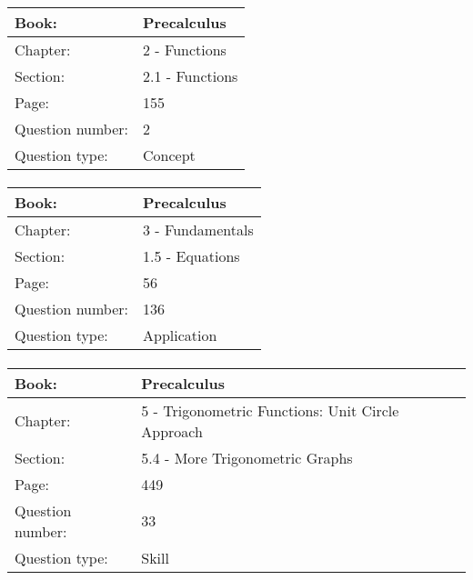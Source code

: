 \documentclass{article}
\begin{document}
   \paragraph{}
   \begin{tabularx}{1\textwidth}{
           p{}
           p{}
       }
       \toprule
       Book: & Precalculus
       \\
       \midrule
       Chapter: & 2 - Functions
       \\
       \midrule
       Section: & 2.1 - Functions
       \\
       \midrule
       Page: & 155
       \\
       \midrule
       Question number: & 2
       \\
       \midrule
       Question type: & Concept
       \\
       \bottomrule
   \end{tabularx}



   \paragraph{}
   \begin{tabularx}{1\textwidth}{
           p{}
           p{}
       }
       \toprule
       Book: & Precalculus
       \\
       \midrule
       Chapter: & 3 - Fundamentals
       \\
       \midrule
       Section: & 1.5 - Equations
       \\
       \midrule
       Page: & 56
       \\
       \midrule
       Question number: & 136
       \\
       \midrule
       Question type: & Application
       \\
       \bottomrule
   \end{tabularx}



   \paragraph{}
   \begin{tabularx}{1\textwidth}{
           p{}
           p{}
       }
       \toprule
       Book: & Precalculus
       \\
       \midrule
       Chapter: & 5 - Trigonometric Functions: Unit Circle Approach
       \\
       \midrule
       Section: & 5.4 - More Trigonometric Graphs
       \\
       \midrule
       Page: & 449
       \\
       \midrule
       Question number: & 33
       \\
       \midrule
       Question type: & Skill
       \\
       \bottomrule
   \end{tabularx}
\end{document}
